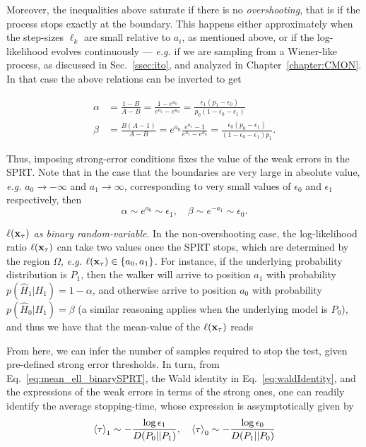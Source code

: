 Moreover, the inequalities above saturate if there is no \emph{overshooting}, that is if the
process stops exactly at the boundary. This happens either approximately when the step-sizes $\ell_{k}$ are small relative to $a_{i}$, as mentioned above, or if the log-likelihood evolves continuously --- \textit{e.g.} if we are sampling from a Wiener-like process, as discussed in Sec.~\ref{ssec:ito}, and analyzed in Chapter~\ref{chapter:CMON}. In that case the above relations can be inverted to get

\begin{align}\label{eq:weakErrorsSPRT}
\alpha &= \frac{1-B}{A-B} = \frac{1-e^{a_0}}{e^{a_1}-e^{a_0}} = \frac{\epsilon_1(p_1 -\epsilon_0)}{p_0(1-\epsilon_0 -\epsilon_1)}\\
\beta &= \frac{B(A-1)}{A-B} =  e^{a_0}\frac{e^{a_1}-1}{e^{a_1}-e^{a_0}} = \frac{\epsilon_0 (p_0 - \epsilon_1)}{(1-\epsilon_0-\epsilon_1)p_1}.
\end{align}

Thus, imposing strong-error conditions fixes the value of the weak errors in the SPRT. Note that in the case that the boundaries are very large in absolute value, \textit{e.g.} $a_0 \rightarrow -\infty$ and $a_1 \rightarrow\infty$, corresponding to very small values of $\epsilon_0$ and $\epsilon_1$ respectively, then
\begin{equation}\label{eq:largeBoundaries}
\alpha \sim e^{a_0}\sim \epsilon_1, \quad \beta \sim e^{-a_1}\sim \epsilon_0.
\end{equation}

\textit{$\ell(\mathbf{x}_\tau)$ as binary random-variable}. In the non-overshooting case, the log-likelihood ratio $\ell(\mathbf{x}_\tau)$ can take two values once the SPRT stops, which are determined by the region $\Omega$, \textit{e.g.} $\ell(\mathbf{x}_\tau)\in\lbrace a_0,a_1\rbrace$. For instance, if the underlying probability distribution is $P_1$, then the walker will arrive to position $a_1$ with probability $p(\hat{H}_1|H_1) = 1-\alpha$, and otherwise arrive to position $a_0$ with probability $p(\hat{H}_0|H_1) = \beta$ (a similar reasoning applies when the underlying model is $P_0$), and thus we have that the mean-value of the $\ell(\mathbf{x}_\tau)$ reads

From here, we can infer the number of samples required to stop the test, given pre-defined strong error thresholds. In turn, from Eq.~\ref{eq:mean_ell_binarySPRT}, the Wald identity in Eq.~\ref{eq:waldIdentity}, and the expressions of the weak errors in terms of the strong ones, one can readily identify the average stopping-time, whose expression is assymptotically given by
\begin{equation}\label{eq:sptrWaldsimple}
\mathinner{\langle \tau\rangle}_{1} \sim -\frac{ \log{\epsilon_1}}{D(P_0||P_1)}, \quad \mathinner{\langle \tau\rangle}_{0} \sim -\frac{\log{\epsilon_0}}{D(P_1||P_0)}
\end{equation}

